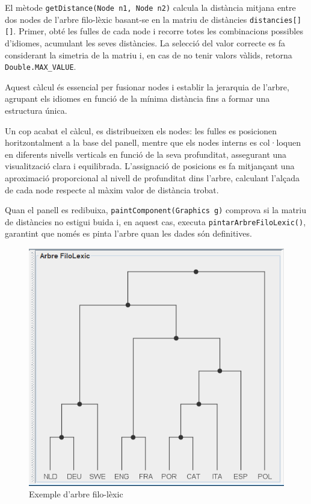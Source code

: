\documentclass{ieeetj}
\begin{document}
\begin{itemize}
\begin{itemize}
       El mètode \texttt{getDistance(Node n1, Node n2)} calcula la distància mitjana entre dos nodes de l’arbre filo-lèxic basant-se en la matriu de distàncies \texttt{distancies[][]}. Primer, obté les fulles de cada node i recorre totes les combinacions possibles d’idiomes, acumulant les seves distàncies. La selecció del valor correcte es fa considerant la simetria de la matriu i, en cas de no tenir valors vàlids, retorna \texttt{Double.MAX\_VALUE}. \newline
       
       Aquest càlcul és essencial per fusionar nodes i establir la jerarquia de l’arbre, agrupant els idiomes en funció de la mínima distància fins a formar una estructura única. \newline
       
       Un cop acabat el càlcul, es distribueixen els nodes: les fulles es posicionen horitzontalment a la base del panell, mentre que els nodes interns es col·loquen en diferents nivells verticals en funció de la seva profunditat, assegurant una visualització clara i equilibrada. L’assignació de posicions es fa mitjançant una aproximació proporcional al nivell de profunditat dins l’arbre, calculant l’alçada de cada node respecte al màxim valor de distància trobat.\newline

        Quan el panell es redibuixa, \texttt{paintComponent(Graphics g)} comprova si la matriu de distàncies no estigui buida i, en aquest cas, executa \texttt{pintarArbreFiloLexic()}, garantint que només es pinta l’arbre quan les dades són definitives.
        \begin{figure}[H]
            \centering
            \includegraphics[width=0.5\linewidth]{png/arbreFilo.png}
            \caption{Exemple d'arbre filo-lèxic}
            \label{fig:enter-label}
        \end{figure}



\end{itemize}
\end{itemize}
\end{document}

